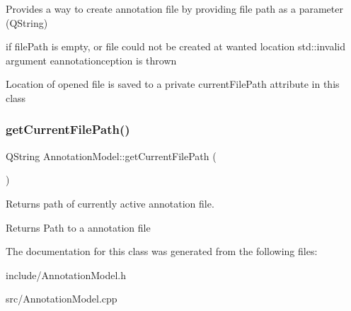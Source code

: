 Provides a way to create annotation file by providing file path as a parameter (Q\+String) 

if file\+Path is empty, or file could not be created at wanted location std\+::invalid argument eannotationception is thrown

Location of opened file is saved to a private current\+File\+Path attribute in this class \mbox{\label{classAnnotationModel_a704170b9d4cc9e6b62e0bc22d17f6e17}} 
\subsubsection{\texorpdfstring{get\+Current\+File\+Path()}{getCurrentFilePath()}}
{\footnotesize\ttfamily Q\+String Annotation\+Model\+::get\+Current\+File\+Path (\begin{DoxyParamCaption}{ }\end{DoxyParamCaption})}



Returns path of currently active annotation file. 

\begin{DoxyReturn}{Returns}
Path to a annotation file 
\end{DoxyReturn}


The documentation for this class was generated from the following files\+:\begin{DoxyCompactItemize}
\item 
include/Annotation\+Model.\+h\item 
src/Annotation\+Model.\+cpp\end{DoxyCompactItemize}
